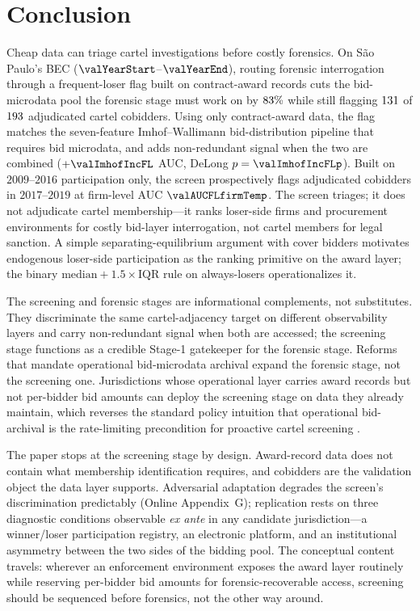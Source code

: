\section{Conclusion}
\label{sec:conclusion}

Cheap data can triage cartel investigations before costly
forensics. On São Paulo's BEC
($\valYearStart$--$\valYearEnd$), routing forensic
interrogation through a frequent-loser flag built on
contract-award records cuts the bid-microdata pool the
forensic stage must work on by $83\%$
while still flagging $131$ of $193$
adjudicated cartel cobidders. Using only contract-award data,
the flag matches the seven-feature Imhof--Wallimann
bid-distribution pipeline that requires bid microdata, and
adds non-redundant signal when the two are combined
($+\valImhofIncFL$ AUC, DeLong $p=\valImhofIncFLp$). Built on
$2009$--$2016$ participation only, the screen prospectively
flags adjudicated cobidders in $2017$--$2019$ at firm-level
AUC $\valAUCFLfirmTemp$. The screen triages; it does not
adjudicate cartel membership---it ranks loser-side firms and
procurement environments for costly bid-layer interrogation,
not cartel members for legal sanction. A simple separating-equilibrium
argument with cover bidders motivates endogenous loser-side
participation as the ranking primitive on the award layer; the
binary $\text{median}+1.5\!\times\!\text{IQR}$ rule on
always-losers operationalizes it.

The screening and forensic stages are informational
complements, not substitutes. They discriminate the same
cartel-adjacency target on different observability layers and
carry non-redundant signal when both are accessed; the
screening stage functions as a credible Stage-1 gatekeeper for
the forensic stage. Reforms that mandate operational
bid-microdata archival expand the forensic stage, not the
screening one. Jurisdictions whose operational layer carries
award records but not per-bidder bid amounts can deploy the
screening stage on data they already maintain, which reverses
the standard policy intuition that operational bid-archival is
the rate-limiting precondition for proactive cartel screening
\citep{becker1968crime,stigler1970optimum,baker2002case,harrington2008detecting}.

The paper stops at the screening stage by design. Award-record
data does not contain what membership identification requires,
and cobidders are the validation object the data layer
supports. Adversarial adaptation degrades the screen's
discrimination predictably (Online Appendix~G); replication
rests on three diagnostic conditions observable \emph{ex ante}
in any candidate jurisdiction---a winner/loser participation
registry, an electronic platform, and an institutional
asymmetry between the two sides of the bidding pool. The
conceptual content travels: wherever an enforcement
environment exposes the award layer routinely while reserving
per-bidder bid amounts for forensic-recoverable access,
screening should be sequenced before forensics, not the other
way around.
